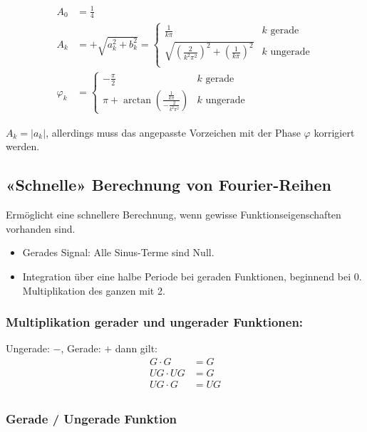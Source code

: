 \begin{align*}
	A_0 &= \frac{1}{4} \\
	A_k &= +\sqrt{a_k^2 + b_k^2} = \begin{cases}
		\frac{1}{k \pi} & k \text{ gerade} \\
		\sqrt{\left(\frac{2}{k^2\pi^2}\right)^2 + \left(\frac{1}{k \pi}\right)^2} & k \text{ ungerade} \\
	\end{cases} \\
	\varphi_k &= \begin{cases}
		-\frac{\pi}{2} & k \text{ gerade} \\
		\pi + \arctan\left( \frac{\frac{1}{k \pi}}{-\frac{2}{k^2 \pi^2}} \right)& k \text{ ungerade}
	\end{cases}
\end{align*}


$A_k = \left| a_k \right|$, allerdings muss das angepasste Vorzeichen mit der Phase $\varphi$ korrigiert werden.


\subsection{«Schnelle» Berechnung von Fourier-Reihen}

Ermöglicht eine schnellere Berechnung, wenn gewisse Funktionseigenschaften vorhanden sind.

\begin{itemize}
\item Gerades Signal: Alle Sinus-Terme sind Null.
\item Integration über eine halbe Periode bei geraden Funktionen, beginnend bei 0. \\
		Multiplikation des ganzen mit 2.
\end{itemize}

\subsubsection{Multiplikation gerader und ungerader Funktionen:}

Ungerade: $-$, Gerade: $+$ dann gilt:
\begin{align*}
	 G \cdot G &= G \\
	 UG \cdot UG &= G \\
	 UG \cdot G &= UG \\
\end{align*}

\subsubsection{Gerade / Ungerade Funktion}

